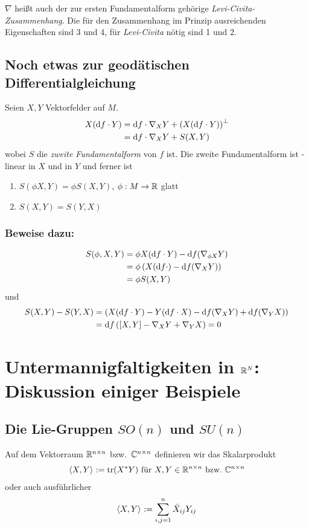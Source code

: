 \documentclass{skript}
\begin{document}
$\nabla$ heißt auch der zur ersten Fundamentalform gehörige
\emph{Levi-Civita-Zusammenhang}. Die für den Zusammenhang im Prinzip
ausreichenden Eigenschaften sind 3 und 4, für \emph{Levi-Civita} nötig sind 1
und 2.

\subsection{Noch etwas zur geodätischen Differentialgleichung}
Seien $X,Y$ Vektorfelder auf $M$.
\begin{align*}
  X(\mathrm d f\cdot Y) &= \mathrm d f\cdot\nabla_XY + \left( X(\mathrm d f\cdot Y) \right)^\perp \\
  &= \mathrm d f\cdot\nabla_XY + S(X,Y)
\end{align*}
wobei $S$ die \emph{zweite Fundamentalform} von $f$ ist. Die zweite
Fundamentalform ist \R-linear in $X$ und in $Y$ und ferner ist
\begin{enumerate}
  \item $S(\phi X, Y) = \phi S(X,Y)$, $\phi:M\to\mathbb{R}$ glatt
  \item $S(X,Y) = S(Y,X)$
\end{enumerate}
\subsubsection{Beweise dazu:}
\begin{align*}
  S(\phi, X, Y) &= \phi X(\mathrm d f\cdot Y) - \mathrm d f(\nabla_{\phi X}Y) \\
  &= \phi\left( X(\mathrm d f\cdot) - \mathrm d f(\nabla_XY) \right) \\
  &= \phi S(X,Y)
\end{align*}
und 
\begin{align*}
  S(X,Y) -S(Y,X) &= \left( X(\mathrm d f\cdot Y) - Y(\mathrm d f\cdot X) - \mathrm d f(\nabla_XY) +
  \mathrm d f(\nabla_YX) \right) \\
  &= \mathrm d f\left( \left[ X,Y \right] - \nabla_XY + \nabla_YX \right) = 0
\end{align*}

\section{Untermannigfaltigkeiten in $\mathbb{R}^N$: Diskussion einiger Beispiele}
\subsection{Die Lie-Gruppen $SO(n)$ und $SU(n)$}
Auf dem Vektorraum $\mathbb{R}^{n\times n}$ bzw.\ $\mathbb{C}^{n\times n}$ definieren wir das
Skalarprodukt
\begin{align*}
  \sprod{X, Y} := \operatorname{tr}(X^*Y) \text{ für } X,Y\in\R^{n\times n}
  \text{ bzw.\ } \C^{n\times n}
\end{align*}
oder auch ausführlicher
\begin{align*}
  \sprod{X,Y} := \sum^n_{i,j=1} \bar{X}_{ij}Y_{ij}
\end{align*}
\end{document}
